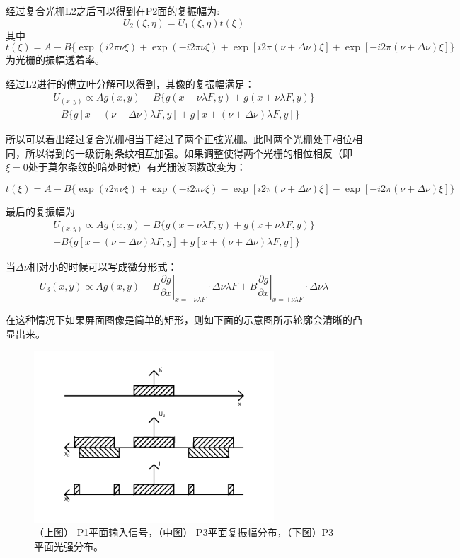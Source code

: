 \documentclass[aps,pre,12pt,preprint,onecolumn,showpacs,showkeys,UTF8]{revtex4-1}
\begin{document}
经过复合光栅L2之后可以得到在P2面的复振幅为:
\begin{equation}
	U_2(\xi,\eta)=U_1(\xi,\eta)t(\xi)
\end{equation}
其中
$$t(\xi)=A-B\{\exp{(i2\pi\nu\xi)}+\exp{(-i2\pi\nu\xi)}+\exp{[i2\pi(\nu+\Delta\nu)\xi]}+\exp{[-i2\pi(\nu+\Delta\nu)\xi]}\}$$
为光栅的振幅透着率。

经过L2进行的傅立叶分解可以得到，其像的复振幅满足：
\begin{equation}
	\begin{split}
	U_(x,y)\propto Ag(x,y)-B\{g(x-\nu\lambda F,y)+g(x+\nu\lambda F,y)\}\\-B\{g[x-(\nu+\Delta\nu)\lambda F,y]+g[x+(\nu+\Delta\nu)\lambda F,y]\}
	\end{split}
\end{equation}

所以可以看出经过复合光栅相当于经过了两个正弦光栅。此时两个光栅处于相位相同，所以得到的一级衍射条纹相互加强。如果调整使得两个光栅的相位相反（即$\xi=0$处于莫尔条纹的暗处时候）有光栅波函数改变为：
 
$$t(\xi)=A-B\{\exp{(i2\pi\nu\xi)}+\exp{(-i2\pi\nu\xi)}-\exp{[i2\pi(\nu+\Delta\nu)\xi]}-\exp{[-i2\pi(\nu+\Delta\nu)\xi]}\}$$

最后的复振幅为
\begin{equation}
	\begin{split}
	U_(x,y)\propto Ag(x,y)-B\{g(x-\nu\lambda F,y)+g(x+\nu\lambda F,y)\}\\+B\{g[x-(\nu+\Delta\nu)\lambda F,y]+g[x+(\nu+\Delta\nu)\lambda F,y]\}
	\end{split}
\end{equation}

当$\Delta\nu$相对小的时候可以写成微分形式：
\begin{equation}
	U_3(x,y)\propto Ag(x,y)-B\left.\frac{\partial g}{\partial x}\right|_{x=-\nu\lambda F}\cdot\Delta\nu\lambda F+B\left.\frac{\partial g}{\partial x}\right|_{x=+\nu\lambda F}\cdot\Delta\nu\lambda 
\end{equation}

在这种情况下如果屏面图像是简单的矩形，则如下面的示意图所示轮廓会清晰的凸显出来。

\begin{figure}[h]
	\begin{center}
		\includegraphics[width=0.8\textwidth]{pic3.png}
		\caption{\label{fig:exp3}（上图） P1平面输入信号，（中图） P3平面复振幅分布，（下图）P3平面光强分布。}
	\end{center}
\end{figure}
\end{document}
